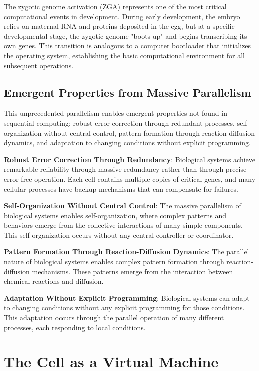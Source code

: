 \documentclass[11pt]{article}
\begin{document}
The zygotic genome activation (ZGA) represents one of the most critical computational events in development. During early development, the embryo relies on maternal RNA and proteins deposited in the egg, but at a specific developmental stage, the zygotic genome "boots up" and begins transcribing its own genes. This transition is analogous to a computer bootloader that initializes the operating system, establishing the basic computational environment for all subsequent operations.

\subsection{Emergent Properties from Massive Parallelism}

This unprecedented parallelism enables emergent properties not found in sequential computing: robust error correction through redundant processes, self-organization without central control, pattern formation through reaction-diffusion dynamics, and adaptation to changing conditions without explicit programming.

\textbf{Robust Error Correction Through Redundancy}: Biological systems achieve remarkable reliability through massive redundancy rather than through precise error-free operation. Each cell contains multiple copies of critical genes, and many cellular processes have backup mechanisms that can compensate for failures.

\textbf{Self-Organization Without Central Control}: The massive parallelism of biological systems enables self-organization, where complex patterns and behaviors emerge from the collective interactions of many simple components. This self-organization occurs without any central controller or coordinator.

\textbf{Pattern Formation Through Reaction-Diffusion Dynamics}: The parallel nature of biological systems enables complex pattern formation through reaction-diffusion mechanisms. These patterns emerge from the interaction between chemical reactions and diffusion.

\textbf{Adaptation Without Explicit Programming}: Biological systems can adapt to changing conditions without any explicit programming for those conditions. This adaptation occurs through the parallel operation of many different processes, each responding to local conditions.

\section{The Cell as a Virtual Machine}
\end{document}
